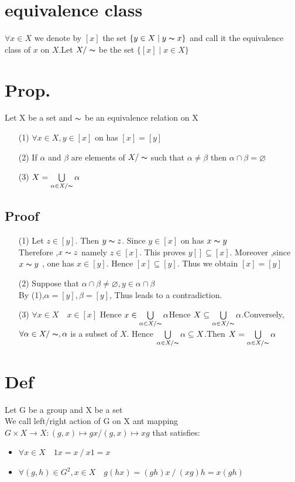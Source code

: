 \documentclass{book}
\begin{document}
\section{equivalence class}
$\forall x\in X$ we denote by $[x]$ the set $\{y\in X\mid y\thicksim x\}$ and call it the equivalence class of $x$ on $X$.Let $X/\thicksim $ be the set $\{[x]\mid x\in X\}$
\section{Prop.}
Let X be a set and $\thicksim$  be an equivalence relation on X
\begin{itemize}
    \item[(1)] $\forall x\in X,y\in [x]$ on has $[x]=[y]$
    \item[(2)] If $\alpha$ and $\beta$ are elements of $X/\thicksim $ such that $\alpha\not=\beta$ then $\alpha\cap\beta =\varnothing$
    \item[(3)] $X=\bigcup\limits_{\alpha\in X/\thicksim }\alpha$
\end{itemize}
\subsection*{Proof}
\begin{itemize}
    \item[(1)] Let $z\in [y]$. Then $y\thicksim z$. Since $y\in [x]$ on has $x\thicksim y$\\Therefore ,$x\thicksim z$ namely $z\in [x]$. This proves $y[]\subseteq [x]$. Moreover ,since $x\thicksim y$ , one has $x\in [y]$. Hence $[x]\subseteq[y]$. Thus we obtain $[x]=[y]$
    \item[(2)] Suppose that $\alpha\cap\beta\not=\varnothing,y\in \alpha\cap\beta$\\By (1),$\alpha=[y],\beta=[y]$, Thus leads to a contradiction.
    \item[(3)] $\forall x\in X\quad x\in [x]$ Hence $x\in \bigcup\limits_{\alpha\in X/\thicksim }\alpha$Hence $X\subseteq\bigcup\limits_{\alpha\in X/\thicksim }\alpha$.Conversely, $\forall \alpha\in X/\thicksim ,\alpha$ is a subset of $X$. Hence $\bigcup\limits_{\alpha\in X/\thicksim }\alpha\subseteq X$.Then $X=\bigcup\limits_{\alpha\in X/\thicksim }\alpha$
\end{itemize}
\section{Def}
Let G be a group and X be a set \\
We call left/right action of G on X ant mapping $G\times X\rightarrow X:(g,x)\mapsto gx/(g,x)\mapsto xg$ that satisfies:
\begin{itemize}
    \item $\forall x\in X\quad 1x=x\ /\ x1=x$
    \item $\forall(g,h)\in G^2,x\in X\quad g(hx)=(gh)x\ /\ (xg)h=x(gh)$
\end{itemize}
\end{document}
